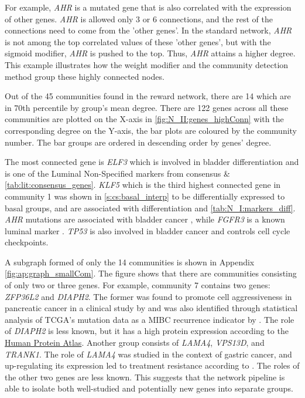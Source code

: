 For example, \textit{AHR} is a mutated gene that is also correlated with the expression of other genes. \textit{AHR} is allowed only 3 or 6 connections, and the rest of the connections need to come from the 'other genes'. In the standard network, \textit{AHR} is not among the top correlated values of these 'other genes', but with the sigmoid modifier, \textit{AHR} is pushed to the top. Thus, \textit{AHR} attains a higher degree. This example illustrates how the weight modifier and the community detection method group these highly connected nodes.

Out of the 45 communities found in the reward network, there are 14 which are in 70th percentile by group's mean degree. There are 122 genes across all these communities are plotted on the X-axis in \cref{fig:N_II:genes_highConn} with the corresponding degree on the Y-axis, the bar plots are coloured by the community number. The bar groups are ordered in descending order by genes' degree.

The most connected gene is \textit{ELF3} which is involved in bladder differentiation and is one of the Luminal Non-Specified markers from consensus \citet{Kamoun2020-tj} \& \cref{tab:lit:consensus_genes}. \textit{KLF5} which is the third highest connected gene in community 1 was shown in \cref{s:cs:basal_interp} to be differentially expressed to basal groups, and are associated with differentiation \citet{ad} and \cref{tab:N_I:markers_diff}.  \textit{AHR} mutations are associated with bladder cancer \citet{}, while \textit{FGFR3} is a known luminal marker \citet{Robertson2017-mg}. \textit{TP53} is also involved in bladder cancer \citet{Robertson2017-mg} and controls cell cycle checkpoints.


A subgraph formed of only the 14 communities is shown in Appendix \cref{fig:ap:graph_smallCom}. The figure shows that there are communities consisting of only two or three genes. For example, community 7 contains two genes: \textit{ZFP36L2} and \textit{DIAPH2}. The former was found to promote cell aggressiveness in pancreatic cancer in a clinical study by \citet{Yonemori2017-ky} and was also identified through statistical analysis of TCGA's mutation data as a MIBC recurrence indicator by \citet{Han2019-ma}. The role of \textit{DIAPH2} is less known, but it has a high protein expression according to the \href{https://www.proteinatlas.org/ENSG00000147202-DIAPH2/tissue}{Human Protein Atlas}. Another group consists of \textit{LAMA4}, \textit{VPS13D}, and \textit{TRANK1}. The role of \textit{LAMA4} was studied in the context of gastric cancer, and up-regulating its expression led to treatment resistance according to \citet{Peng2020-xe}. The roles of the other two genes are less known. This suggests that the network pipeline is able to isolate both well-studied and potentially new genes into separate groups.


